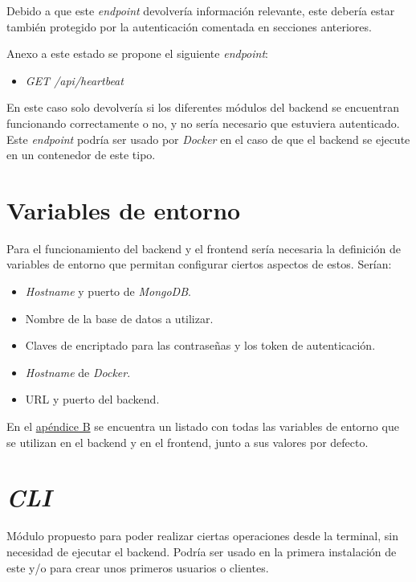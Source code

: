 \bigskip
Debido a que este \textit{endpoint} devolvería información relevante, este debería estar también protegido por la autenticación comentada en secciones anteriores.

\bigskip
Anexo a este estado se propone el siguiente \textit{endpoint}:
\begin{itemize}
	\item \textit{GET /api/heartbeat}
\end{itemize}


\bigskip
En este caso solo devolvería si los diferentes módulos del backend se encuentran funcionando correctamente o no, y no sería necesario que estuviera autenticado. Este \textit{endpoint} podría ser usado por \textit{Docker} en el caso de que el backend se ejecute en un contenedor de este tipo.



\section{Variables de entorno}
\label{sec:variablescap6}

Para el funcionamiento del backend y el frontend sería necesaria la definición de variables de entorno que permitan configurar ciertos aspectos de estos. Serían:
\begin{itemize}
	\item \textit{Hostname} y puerto de \textit{MongoDB}.
	\item Nombre de la base de datos a utilizar.
	\item Claves de encriptado para las contraseñas y los token de autenticación.
	\item \textit{Hostname} de \textit{Docker}.
	\item URL y puerto del backend.
\end{itemize}

\smallskip
En el \hyperref[sec:variables]{apéndice B} se encuentra un listado con todas las variables de entorno que se utilizan en el backend y en el frontend, junto a sus valores por defecto.





\section{\textit{CLI}}
\label{sec:clicap6}

Módulo propuesto para poder realizar ciertas operaciones desde la terminal, sin necesidad de ejecutar el backend. Podría ser usado en la primera instalación de este y/o para crear unos primeros usuarios o clientes.

